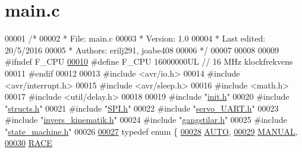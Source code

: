 \hypertarget{styr_2styr_2main_8c_source}{}\section{main.\+c}
\label{styr_2styr_2main_8c_source}

\begin{DoxyCode}
00001 \textcolor{comment}{/*}
00002 \textcolor{comment}{ *        File: main.c}
00003 \textcolor{comment}{ *     Version: 1.0}
00004 \textcolor{comment}{ * Last edited: 20/5/2016 }
00005 \textcolor{comment}{ *     Authors: erilj291, joabe408}
00006 \textcolor{comment}{ */} 
00007 
00008 
00009 \textcolor{preprocessor}{#ifndef F\_CPU}
\hypertarget{styr_2styr_2main_8c_source.tex_l00010}{}\hyperlink{styr_2styr_2main_8c_a43bafb28b29491ec7f871319b5a3b2f8}{00010} \textcolor{preprocessor}{#define F\_CPU 16000000UL        // 16 MHz klockfrekvens}
00011 \textcolor{preprocessor}{#endif}
00012 
00013 \textcolor{preprocessor}{#include <avr/io.h>}
00014 \textcolor{preprocessor}{#include <avr/interrupt.h>}
00015 \textcolor{preprocessor}{#include <avr/sleep.h>}
00016 \textcolor{preprocessor}{#include <math.h>}
00017 \textcolor{preprocessor}{#include <util/delay.h>}
00018 
00019 \textcolor{preprocessor}{#include "\hyperlink{init_8h}{init.h}"}
00020 \textcolor{preprocessor}{#include "\hyperlink{structs_8h}{structs.h}"}
00021 \textcolor{preprocessor}{#include "\hyperlink{_s_p_i_8h}{SPI.h}"}
00022 \textcolor{preprocessor}{#include "\hyperlink{servo___u_a_r_t_8h}{servo\_UART.h}"}
00023 \textcolor{preprocessor}{#include "\hyperlink{invers__kinematik_8h}{invers\_kinematik.h}"}
00024 \textcolor{preprocessor}{#include "\hyperlink{gangstilar_8h}{gangstilar.h}"}
00025 \textcolor{preprocessor}{#include "\hyperlink{state__machine_8h}{state\_machine.h}"}
00026 
\hypertarget{styr_2styr_2main_8c_source.tex_l00027}{}\hyperlink{styr_2styr_2main_8c_aeb6c30b72b6dd0937e2d45de44322a49}{00027} \textcolor{keyword}{typedef} \textcolor{keyword}{enum}  \{
\hypertarget{styr_2styr_2main_8c_source.tex_l00028}{}\hyperlink{styr_2styr_2main_8c_aeb6c30b72b6dd0937e2d45de44322a49aeef9468d1b98bca652a04bf5063fd9d6}{00028}     \hyperlink{styr_2styr_2main_8c_aeb6c30b72b6dd0937e2d45de44322a49aeef9468d1b98bca652a04bf5063fd9d6}{AUTO},
\hypertarget{styr_2styr_2main_8c_source.tex_l00029}{}\hyperlink{styr_2styr_2main_8c_aeb6c30b72b6dd0937e2d45de44322a49a506e8dd29460ea318b68d035f679b01b}{00029}     \hyperlink{styr_2styr_2main_8c_aeb6c30b72b6dd0937e2d45de44322a49a506e8dd29460ea318b68d035f679b01b}{MANUAL},
\hypertarget{styr_2styr_2main_8c_source.tex_l00030}{}\hyperlink{styr_2styr_2main_8c_aeb6c30b72b6dd0937e2d45de44322a49a32390bcc102a1bb79dbd1bc473633933}{00030}     \hyperlink{styr_2styr_2main_8c_aeb6c30b72b6dd0937e2d45de44322a49a32390bcc102a1bb79dbd1bc473633933}{RACE}

\end{DoxyCode}
